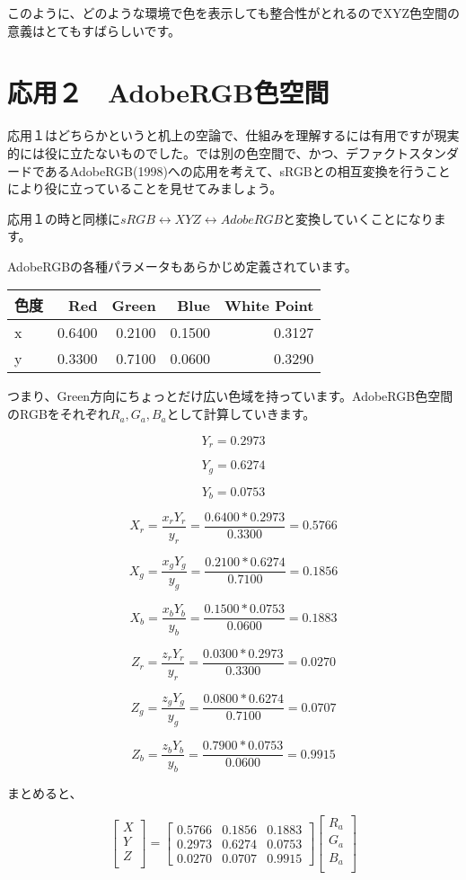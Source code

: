 \documentclass[12pt]{jsarticle}
\begin{document}
このように、どのような環境で色を表示しても整合性がとれるのでXYZ色空間の意義はとてもすばらしいです。

\section{応用２　AdobeRGB色空間}

応用１はどちらかというと机上の空論で、仕組みを理解するには有用ですが現実的には役に立たないものでした。では別の色空間で、かつ、デファクトスタンダードであるAdobeRGB(1998)への応用を考えて、sRGBとの相互変換を行うことにより役に立っていることを見せてみましょう。

応用１の時と同様に$sRGB \leftrightarrow XYZ \leftrightarrow AdobeRGB$と変換していくことになります。

AdobeRGBの各種パラメータもあらかじめ定義されています。

\begin{center}
\begin{tabular}{|l|r|r|r|r|} \hline
色度 & Red & Green & Blue & White Point \\ \hline
x & 0.6400 & 0.2100 & 0.1500 & 0.3127 \\ \hline
y & 0.3300 & 0.7100 & 0.0600 & 0.3290 \\ \hline
\end{tabular}
\end{center}

つまり、Green方向にちょっとだけ広い色域を持っています。AdobeRGB色空間のRGBをそれぞれ$R_a, G_a, B_a$として計算していきます。

\[
Y_r = 0.2973
\]

\[
Y_g = 0.6274
\]

\[
Y_b = 0.0753
\]

\[
X_r = \frac{x_rY_r}{y_r} = \frac{0.6400 * 0.2973}{0.3300} = 0.5766
\]

\[
X_g = \frac{x_gY_g}{y_g} = \frac{0.2100 * 0.6274}{0.7100} = 0.1856
\]

\[
X_b = \frac{x_bY_b}{y_b} = \frac{0.1500 * 0.0753}{0.0600} = 0.1883
\]

\[
Z_r = \frac{z_r Y_r}{y_r} = \frac{0.0300 * 0.2973}{0.3300} = 0.0270
\]

\[
Z_g = \frac{z_g Y_g}{y_g} = \frac{0.0800 * 0.6274}{0.7100} = 0.0707
\]

\[
Z_b = \frac{z_b Y_b}{y_b} = \frac{0.7900 * 0.0753}{0.0600} = 0.9915
\]

まとめると、

\[
\begin{bmatrix}
X \\
Y \\
Z \\
\end{bmatrix}
=
\begin{bmatrix}
0.5766 & 0.1856 & 0.1883 \\
0.2973 & 0.6274 & 0.0753 \\
0.0270 & 0.0707 & 0.9915
\end{bmatrix}
\begin{bmatrix}
R_{a} \\
G_{a} \\
B_{a} \\
\end{bmatrix}
\]
\end{document}
